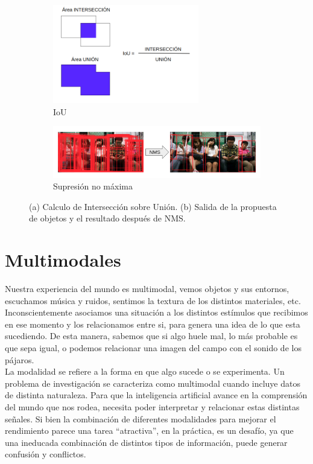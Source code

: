 \begin{figure}[]
	\begin{subfigure}{.5\textwidth}
		\centering
		\includegraphics[width=0.7\textwidth]{img/iou.png}
		\caption{IoU}
		\label{fig:IoU}
	\end{subfigure}
	\begin{subfigure}{.5\textwidth}
		\centering
		\includegraphics[width=1.1\textwidth]{img/NMS.png}
		\caption{Supresión no máxima}
		\label{fig:NMS}
	\end{subfigure}
	\caption{(a) Calculo de Intersección sobre Unión. (b) Salida de la propuesta de objetos y el resultado después de NMS.}
		\label{fig:RP}
\end{figure}

\section{Multimodales} \label{sec:multimodales}

Nuestra experiencia del mundo es multimodal, vemos objetos y sus entornos, escuchamos música y ruidos, sentimos la textura de los distintos materiales, etc.  Inconscientemente asociamos una situación a los distintos estímulos que recibimos en ese momento y los relacionamos entre si, para genera una idea de lo que esta sucediendo. De esta manera, sabemos que si algo huele mal, lo más probable es que sepa igual, o podemos relacionar una imagen del campo con el sonido de los pájaros.\\

La modalidad se refiere a la forma en que algo sucede o se experimenta. Un problema de investigación se caracteriza como multimodal cuando incluye datos de distinta naturaleza. Para que la inteligencia artificial avance en la comprensión del mundo que nos rodea, necesita poder interpretar y relacionar estas distintas señales. Si bien la combinación de diferentes modalidades para mejorar el rendimiento parece una tarea ``atractiva'', en la práctica, es un desafío, ya que una ineducada combinación de distintos tipos de información, puede generar confusión y conflictos. 

